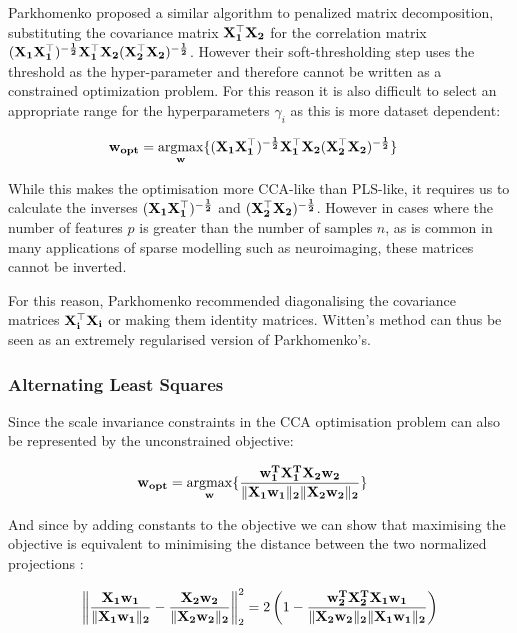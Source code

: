 Parkhomenko proposed a similar algorithm to penalized matrix decomposition, substituting the covariance matrix $\bold{X_1^{\top}X_2}$ for the correlation matrix $\bold{(X_1X_1^{\top})^{-\frac{1}{2}}X_1^{\top}X_2(X_2^{\top}X_2)^{-\frac{1}{2}}}$\cite{parkhomenko2009sparse}. However their soft-thresholding step uses the threshold as the hyper-parameter and therefore cannot be written as a constrained optimization problem. For this reason it is also difficult to select an appropriate range for the hyperparameters $\gamma_i$ as this is more dataset dependent:

\begin{align}
    \label{eq:parkho}
    & \bold{w_{opt}}=\underset{\bold{w}}{\mathrm{argmax}}\{ \bold{(X_1X_1^{\top})^{-\frac{1}{2}}X_1^{\top}X_2(X_2^{\top}X_2)^{-\frac{1}{2}}} \}
\end{align}

While this makes the optimisation more CCA-like than PLS-like, it requires us to calculate the inverses $\bold{(X_1X_1^{\top})^{-\frac{1}{2}}}$ and $\bold{(X_2^{\top}X_2)^{-\frac{1}{2}}}$. However in cases where the number of features $p$ is greater than the number of samples $n$, as is common in many applications of sparse modelling such as neuroimaging, these matrices cannot be inverted. 

For this reason, Parkhomenko recommended diagonalising the covariance matrices $\bold{X_i^{\top}X_i}$ or making them identity matrices. Witten's method can thus be seen as an extremely regularised version of Parkhomenko's. 

\subsubsection{Alternating Least Squares}\label{sec:ALS}

Since the scale invariance constraints in the CCA optimisation problem can also be represented by the unconstrained objective: 

\begin{align}
    & \bold{w_{opt}}=\underset{\bold{w}}{\mathrm{argmax}}\{\bold{\frac{\bold{w_1^{T}X_1^{T}X_2w_2}}{\|\bold{X_1w_1}\|_{2}\|\bold{X_2w_2}\|_{2}}}\}
\end{align}

And since by adding constants to the objective we can show that maximising the objective is equivalent to minimising the distance between the two normalized projections \cite{golub1995canonical}:

\begin{align}
    \left\|\bold{\frac{X_1 w_1}{\|X_1 w_1\|_{2}}-\frac{X_2 w_2}{\|X_2 w_2\|_{2}}}\right\|_{2}^{2}=2\left(1-\bold{\frac{w_2^{T} X_2^{T} X_1 w_1}{\|X_2 w_2\|_{2}\|X_1 w_1\|_{2}}}\right)
\end{align}

